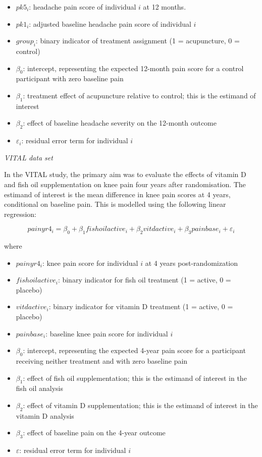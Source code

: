 \documentclass{article}
\providecommand{\tightlist}{%
  \setlength{\itemsep}{0pt}\setlength{\parskip}{0pt}}
\begin{document}
\begin{itemize}
\tightlist
\item
  \(pk5_i\): headache pain score of individual \(i\) at 12 months.
\item
  \(pk1_i\): adjusted baseline headache pain score of individual \(i\)
\item
  \(group_i\): binary indicator of treatment assignment (1 =
  acupuncture, 0 = control)
\item
  \(\beta_0\): intercept, representing the expected 12-month pain score
  for a control participant with zero baseline pain
\item
  \(\beta_1\): treatment effect of acupuncture relative to control; this
  is the estimand of interest
\item
  \(\beta_2\): effect of baseline headache severity on the 12-month
  outcome
\item
  \(\varepsilon_i\): residual error term for individual \(i\)
\end{itemize}

\emph{VITAL data set}

In the VITAL study, the primary aim was to evaluate the effects of
vitamin D and fish oil supplementation on knee pain four years after
randomisation. The estimand of interest is the mean difference in knee
pain scores at 4 years, conditional on baseline pain. This is modelled
using the following linear regression:

\[painyr4_i = \beta_0 + \beta_1 fishoilactive_i + \beta_2 vitdactive_i + \beta_3 painbase_i + \varepsilon_i\]

where

\begin{itemize}
\tightlist
\item
  \(painyr4_i\): knee pain score for individual \(i\) at 4 years
  post-randomization
\item
  \(fishoilactive_i\): binary indicator for fish oil treatment (1 =
  active, 0 = placebo)
\item
  \(vitdactive_i\): binary indicator for vitamin D treatment (1 =
  active, 0 = placebo)
\item
  \(painbase_i\): baseline knee pain score for individual \(i\)
\item
  \(\beta_0\): intercept, representing the expected 4-year pain score
  for a participant receiving neither treatment and with zero baseline
  pain
\item
  \(\beta_1\): effect of fish oil supplementation; this is the estimand
  of interest in the fish oil analysis
\item
  \(\beta_2\): effect of vitamin D supplementation; this is the estimand
  of interest in the vitamin D analysis
\item
  \(\beta_3\): effect of baseline pain on the 4-year outcome
\item
  \(\varepsilon\): residual error term for individual \(i\)
\end{itemize}
\end{document}
